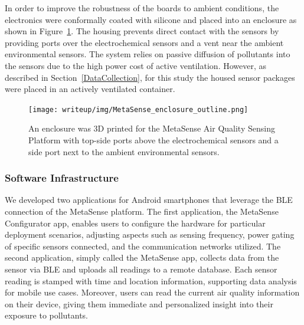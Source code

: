 \documentclass[journal abbreviation, manuscript]{copernicus}
\begin{document}
In order to improve the robustness of the boards to ambient conditions, the electronics were conformally coated with silicone and placed into an enclosure as shown in Figure~\ref{fig:img-enclosure}. The housing prevents direct contact with the sensors by providing ports over the electrochemical sensors and a vent near the ambient environmental sensors. The system relies on passive diffusion of pollutants into the sensors due to the high power cost of active ventilation.  However, as described in Section~\ref{DataCollection}, for this study the housed sensor packages were placed in an actively ventilated container.



\begin{figure}[t]
\centering
\texttt{[image: writeup/img/MetaSense\_enclosure\_outline.png]}
\caption{An enclosure was 3D printed for the MetaSense Air Quality Sensing Platform with top-side ports above the electrochemical sensors and a side port next to the ambient environmental sensors.}
\label{fig:img-enclosure}
\end{figure}

\subsubsection{Software Infrastructure}


We developed two applications for Android smartphones that leverage the BLE connection of the MetaSense platform. The first application, the MetaSense Configurator app, enables users to configure the hardware for particular deployment scenarios, adjusting aspects such as sensing frequency, power gating of specific sensors connected, and the communication networks utilized.  The second application, simply called the MetaSense app, collects data from the sensor via BLE and uploads all readings to a remote database.  Each sensor reading is stamped with time and location information, supporting data analysis for mobile use cases. Moreover, users can read the current air quality information on their device, giving them immediate and personalized insight into their exposure to pollutants.
\end{document}
